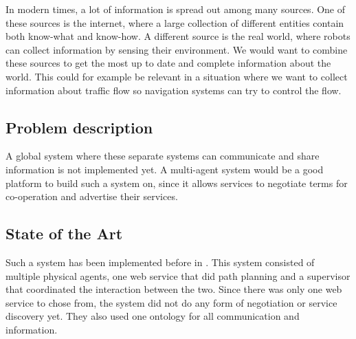 In modern times, a lot of information is spread out among many sources. One
of these sources is the internet, where a large collection of different
entities contain both know-what and know-how.  A different source is the
real world, where robots can collect information by sensing their
environment. We would want to combine these sources to get the most up to
date and complete information about the world. This could for example be
relevant in a situation where we want to collect information about traffic
flow so navigation systems can try to control the flow.

\subsection{Problem description} 

A global system where these separate systems can communicate and share information
is not implemented yet. A multi-agent system would be a good platform to
build such a system on, since it allows services to negotiate terms for
co-operation and advertise their services. 


\subsection{State of the Art} 

Such a system has been implemented before in \cite{intframe}. This system
consisted of multiple physical agents, one web service that did path
planning and a supervisor that coordinated the interaction between the two.
Since there was only one web service to chose from, the system did not do
any form of negotiation or service discovery yet. They also used one
ontology for all communication and information.

